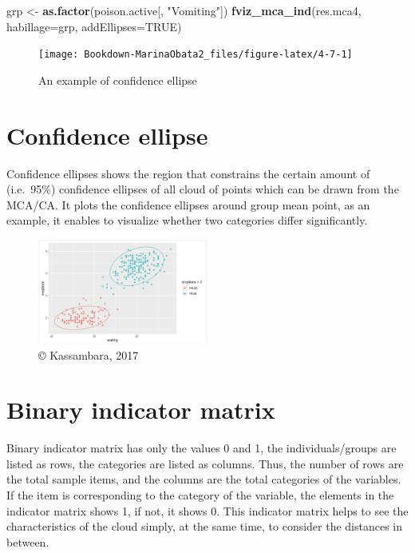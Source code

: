 \documentclass[]{book}
\newenvironment{Shaded}{\begin{snugshade}}{\end{snugshade}}
\newcommand{\DataTypeTok}[1]{\textcolor[rgb]{0.13,0.29,0.53}{#1}}
\newcommand{\KeywordTok}[1]{\textcolor[rgb]{0.13,0.29,0.53}{\textbf{#1}}}
\newcommand{\NormalTok}[1]{#1}
\newcommand{\OtherTok}[1]{\textcolor[rgb]{0.56,0.35,0.01}{#1}}
\newcommand{\StringTok}[1]{\textcolor[rgb]{0.31,0.60,0.02}{#1}}
\begin{document}
\begin{Shaded}
\begin{Highlighting}[]
\NormalTok{grp <-}\StringTok{ }\KeywordTok{as.factor}\NormalTok{(poison.active[, }\StringTok{"Vomiting"}\NormalTok{])}
\KeywordTok{fviz_mca_ind}\NormalTok{(res.mca4, }\DataTypeTok{habillage=}\NormalTok{grp,}
             \DataTypeTok{addEllipses=}\OtherTok{TRUE}\NormalTok{)}
\end{Highlighting}
\end{Shaded}

\begin{figure}
\texttt{[image: Bookdown-MarinaObata2\_files/figure-latex/4-7-1]} \caption{An example of confidence ellipse}\label{fig:4-7}
\end{figure}

\hypertarget{confidence-ellipse}{%
\section{Confidence ellipse}\label{confidence-ellipse}}

Confidence ellipses shows the region that constrains the certain amount of (i.e.~95\%) confidence ellipses of all cloud of points which can be drawn from the MCA/CA. It plots the confidence ellipses around group mean point, as an example, it enables to visualize whether two categories differ significantly.

\begin{figure}
\centering
\includegraphics[width=0.5\textwidth,height=\textheight]{confident ellipse.png}
\caption{© Kassambara, 2017}
\end{figure}

\hypertarget{binary-indicator-matrix}{%
\section{Binary indicator matrix}\label{binary-indicator-matrix}}

Binary indicator matrix has only the values 0 and 1, the individuals/groups are listed as rows, the categories are listed as columns. Thus, the number of rows are the total sample items, and the columns are the total categories of the variables. If the item is corresponding to the category of the variable, the elements in the indicator matrix shows 1, if not, it shows 0. This indicator matrix helps to see the characteristics of the cloud simply, at the same time, to consider the distances in between.
\end{document}
